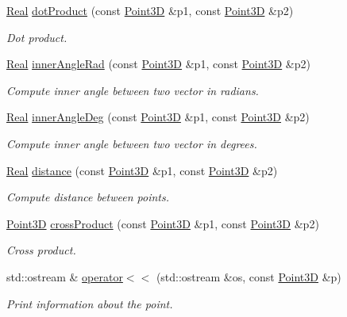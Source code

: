 \begin{DoxyCompactItemize}
\hyperlink{namespaceFVCode3D_a40c1f5588a248569d80aa5f867080e83}{Real} \hyperlink{classFVCode3D_1_1Point3D_abed858bc07c6f152b0307c824486887c}{dot\+Product} (const \hyperlink{classFVCode3D_1_1Point3D}{Point3D} \&p1, const \hyperlink{classFVCode3D_1_1Point3D}{Point3D} \&p2)
\begin{DoxyCompactList}\small\item\em Dot product. \end{DoxyCompactList}\item 
\hyperlink{namespaceFVCode3D_a40c1f5588a248569d80aa5f867080e83}{Real} \hyperlink{classFVCode3D_1_1Point3D_ae6dfa3be3cb055f156e105091599b5e6}{inner\+Angle\+Rad} (const \hyperlink{classFVCode3D_1_1Point3D}{Point3D} \&p1, const \hyperlink{classFVCode3D_1_1Point3D}{Point3D} \&p2)
\begin{DoxyCompactList}\small\item\em Compute inner angle between two vector in radians. \end{DoxyCompactList}\item 
\hyperlink{namespaceFVCode3D_a40c1f5588a248569d80aa5f867080e83}{Real} \hyperlink{classFVCode3D_1_1Point3D_a3fade3157c26f62dd589b7c4b3eba346}{inner\+Angle\+Deg} (const \hyperlink{classFVCode3D_1_1Point3D}{Point3D} \&p1, const \hyperlink{classFVCode3D_1_1Point3D}{Point3D} \&p2)
\begin{DoxyCompactList}\small\item\em Compute inner angle between two vector in degrees. \end{DoxyCompactList}\item 
\hyperlink{namespaceFVCode3D_a40c1f5588a248569d80aa5f867080e83}{Real} \hyperlink{classFVCode3D_1_1Point3D_af7cc7631755aaf9b6ff4bc328be2f20c}{distance} (const \hyperlink{classFVCode3D_1_1Point3D}{Point3D} \&p1, const \hyperlink{classFVCode3D_1_1Point3D}{Point3D} \&p2)
\begin{DoxyCompactList}\small\item\em Compute distance between points. \end{DoxyCompactList}\item 
\hyperlink{classFVCode3D_1_1Point3D}{Point3D} \hyperlink{classFVCode3D_1_1Point3D_a065de1710a2bd7a7b6a33ec14eae4688}{cross\+Product} (const \hyperlink{classFVCode3D_1_1Point3D}{Point3D} \&p1, const \hyperlink{classFVCode3D_1_1Point3D}{Point3D} \&p2)
\begin{DoxyCompactList}\small\item\em Cross product. \end{DoxyCompactList}\item 
std\+::ostream \& \hyperlink{classFVCode3D_1_1Point3D_a4d6f968755c16f7bd5d6c1a14fde3910}{operator$<$$<$} (std\+::ostream \&os, const \hyperlink{classFVCode3D_1_1Point3D}{Point3D} \&p)
\begin{DoxyCompactList}\small\item\em Print information about the point. \end{DoxyCompactList}\end{DoxyCompactItemize}


